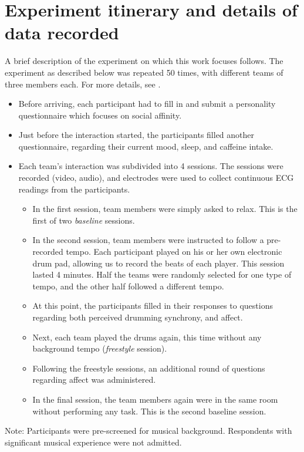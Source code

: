 \documentclass[a4paper, 11pt]{report}      %
\begin{document}
\section{Experiment itinerary and details of data recorded}
A brief description of the experiment on which this work focuses follows. The experiment as described below was repeated 50 times, with different teams of three members each. For more details, see \cite{gordon2020physio}.
\begin{itemize}
    \item Before arriving, each participant had to fill in and submit a personality questionnaire which focuses on social affinity.
    \item Just before the interaction started, the participants filled another questionnaire, regarding their current mood, sleep, and caffeine intake.

    \item Each team's interaction was subdivided into 4 sessions. The sessions were recorded (video, audio), and electrodes were used to collect continuous ECG readings from the participants. 
    \begin{itemize}
        \item In the first session, team members were simply asked to relax. This is the first of two \emph{baseline} sessions.
        \item In the second session, team members were instructed to follow a pre-recorded tempo. Each participant played on his or her own electronic drum pad, allowing us to record the beats of each player. This session lasted 4 minutes. Half the teams were randomly selected for one type of tempo, and the other half followed a different tempo.
        \item At this point, the participants filled in their responses to questions regarding both perceived drumming synchrony, and affect.
        \item Next, each team played the drums again, this time without any background tempo (\emph{freestyle} session).
        \item Following the freestyle sessions, an additional round of questions regarding affect was administered. 
        \item In the final session, the team members again were in the same room without performing any task. This is the second baseline session.
    \end{itemize}
\end{itemize}
Note: Participants were pre-screened for musical  background. Respondents with significant musical experience were not admitted.





\end{document}
